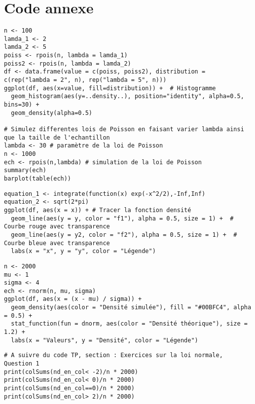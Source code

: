\section*{Code annexe}

\begin{lstlisting}[caption=Code : Variation des paramètres de la loi Poisson, label=lst:poisson]
n <- 100
lamda_1 <- 2
lamda_2 <- 5
poiss <- rpois(n, lambda = lamda_1)
poiss2 <- rpois(n, lambda = lamda_2)
df <- data.frame(value = c(poiss, poiss2), distribution = c(rep("lambda = 2", n), rep("lambda = 5", n)))
ggplot(df, aes(x=value, fill=distribution)) +  # Histogramme
  geom_histogram(aes(y=..density..), position="identity", alpha=0.5, bins=30) + 
  geom_density(alpha=0.5)

# Simulez differentes lois de Poisson en faisant varier lambda ainsi que la taille de l'echantillon
lambda <- 30 # paramètre de la loi de Poisson
n <- 1000
ech <- rpois(n,lambda) # simulation de la loi de Poisson
summary(ech)
barplot(table(ech))
\end{lstlisting}

\begin{lstlisting}[caption=Code : Vérification de l'égalité, label=lst:comparaison]
equation_1 <- integrate(function(x) exp(-x^2/2),-Inf,Inf)
equation_2 <- sqrt(2*pi)
ggplot(df, aes(x = x)) + # Tracer la fonction densité
  geom_line(aes(y = y, color = "f1"), alpha = 0.5, size = 1) +  # Courbe rouge avec transparence
  geom_line(aes(y = y2, color = "f2"), alpha = 0.5, size = 1) +  # Courbe bleue avec transparence
  labs(x = "x", y = "y", color = "Légende")
\end{lstlisting}

\begin{lstlisting}[caption=Code : Probabilités des lois normales, label=lst:theoreme]
n <- 2000
mu <- 1
sigma <- 4
ech <- rnorm(n, mu, sigma)
ggplot(df, aes(x = (x - mu) / sigma)) +
  geom_density(aes(color = "Densité simulée"), fill = "#00BFC4", alpha = 0.5) +
  stat_function(fun = dnorm, aes(color = "Densité théorique"), size = 1.2) +
  labs(x = "Valeurs", y = "Densité", color = "Légende")
\end{lstlisting}

\begin{lstlisting}[caption=Code : Probabilités des lois normales, label=lst:q1]
# A suivre du code TP, section : Exercices sur la loi normale, Question 1
print(colSums(nd_en_col< -2)/n * 2000)
print(colSums(nd_en_col< 0)/n * 2000)
print(colSums(nd_en_col==0)/n * 2000)
print(colSums(nd_en_col> 2)/n * 2000)
\end{lstlisting}

